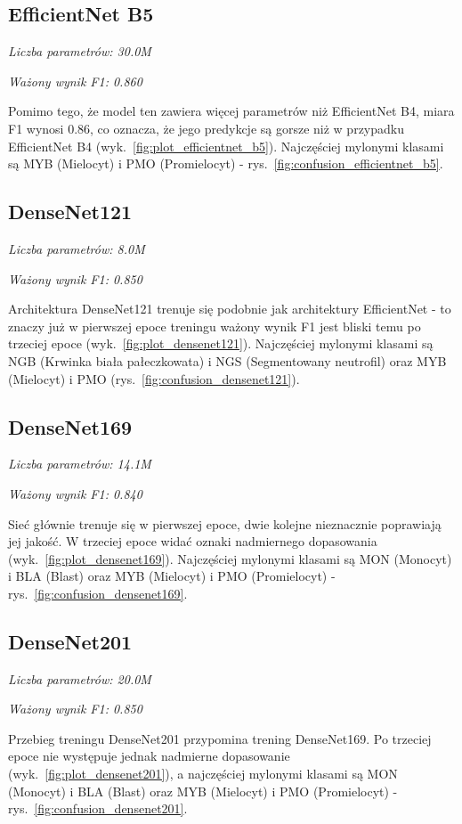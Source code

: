 \subsection{EfficientNet B5}
\textit{Liczba parametrów: 30.0M}

\textit{Ważony wynik F1: 0.860}

Pomimo tego, że model ten zawiera więcej parametrów niż EfficientNet B4, miara F1 wynosi 0.86, co oznacza, że jego predykcje są gorsze niż w przypadku EfficientNet B4 (wyk.~\ref{fig:plot_efficientnet_b5}).
Najczęściej mylonymi klasami są MYB (Mielocyt) i PMO (Promielocyt) - rys.~\ref{fig:confusion_efficientnet_b5}.

\subsection{DenseNet121}
\textit{Liczba parametrów: 8.0M}

\textit{Ważony wynik F1: 0.850}

Architektura DenseNet121 trenuje się podobnie jak architektury EfficientNet - to znaczy już w pierwszej epoce treningu ważony wynik F1 jest bliski temu po trzeciej epoce (wyk.~\ref{fig:plot_densenet121}).
Najczęściej mylonymi klasami są NGB (Krwinka biała pałeczkowata) i NGS (Segmentowany neutrofil) oraz MYB (Mielocyt) i PMO (rys.~\ref{fig:confusion_densenet121}).

\subsection{DenseNet169}
\textit{Liczba parametrów: 14.1M}

\textit{Ważony wynik F1: 0.840}

Sieć głównie trenuje się w pierwszej epoce, dwie kolejne nieznacznie poprawiają jej jakość.
W trzeciej epoce widać oznaki nadmiernego dopasowania (wyk.~\ref{fig:plot_densenet169}).
Najczęściej mylonymi klasami są MON (Monocyt) i BLA (Blast) oraz MYB (Mielocyt) i PMO (Promielocyt) - rys.~\ref{fig:confusion_densenet169}.

\subsection{DenseNet201}
\textit{Liczba parametrów: 20.0M}

\textit{Ważony wynik F1: 0.850}

Przebieg treningu DenseNet201 przypomina trening DenseNet169.
Po trzeciej epoce nie występuje jednak nadmierne dopasowanie (wyk.~\ref{fig:plot_densenet201}), a najczęściej mylonymi klasami są MON (Monocyt) i BLA (Blast) oraz MYB (Mielocyt) i PMO (Promielocyt) - rys.~\ref{fig:confusion_densenet201}.

